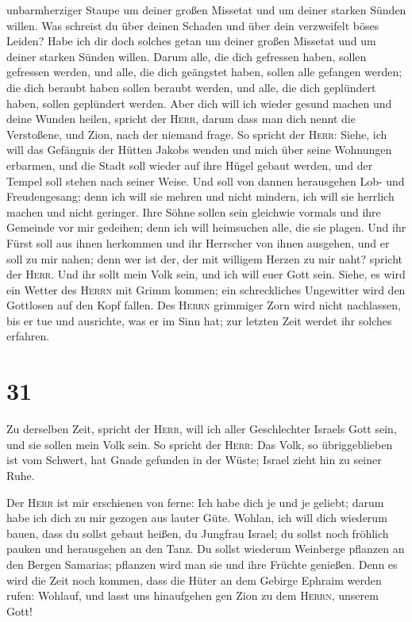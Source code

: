 unbarmherziger Staupe um deiner großen Missetat und um deiner starken
Sünden willen.  Was schreist du über deinen Schaden und
über dein verzweifelt böses Leiden? Habe ich dir doch solches getan um
deiner großen Missetat und um deiner starken Sünden willen.
 Darum alle, die dich gefressen haben, sollen gefressen
werden, und alle, die dich geängstet haben, sollen alle gefangen werden;
die dich beraubt haben sollen beraubt werden, und alle, die dich
geplündert haben, sollen geplündert werden.  Aber dich
will ich wieder gesund machen und deine Wunden heilen, spricht der
\textsc{Herr}, darum dass man dich nennt die Verstoßene, und Zion, nach
der niemand frage.  So spricht der \textsc{Herr}: Siehe,
ich will das Gefängnis der Hütten Jakobs wenden und mich über seine
Wohnungen erbarmen, und die Stadt soll wieder auf ihre Hügel gebaut
werden, und der Tempel soll stehen nach seiner Weise. 
Und soll von dannen herausgehen Lob- und Freudengesang; denn ich will
sie mehren und nicht mindern, ich will sie herrlich machen und nicht
geringer.  Ihre Söhne sollen sein gleichwie vormals und
ihre Gemeinde vor mir gedeihen; denn ich will heimsuchen alle, die sie
plagen.  Und ihr Fürst soll aus ihnen herkommen und ihr
Herrscher von ihnen ausgehen, und er soll zu mir nahen; denn wer ist
der, der mit willigem Herzen zu mir naht? spricht der \textsc{Herr}.
 Und ihr sollt mein Volk sein, und ich will euer Gott
sein.  Siehe, es wird ein Wetter des \textsc{Herrn} mit
Grimm kommen; ein schreckliches Ungewitter wird den Gottlosen auf den
Kopf fallen.  Des \textsc{Herrn} grimmiger Zorn wird
nicht nachlassen, bis er tue und ausrichte, was er im Sinn hat; zur
letzten Zeit werdet ihr solches erfahren.

\hypertarget{section-30}{%
\section{31}\label{section-30}}

 Zu derselben Zeit, spricht der \textsc{Herr}, will ich
aller Geschlechter Israels Gott sein, und sie sollen mein Volk sein.
 So spricht der \textsc{Herr}: Das Volk, so übriggeblieben
ist vom Schwert, hat Gnade gefunden in der Wüste; Israel zieht hin zu
seiner Ruhe.

 Der \textsc{Herr} ist mir erschienen von ferne: Ich habe
dich je und je geliebt; darum habe ich dich zu mir gezogen aus lauter
Güte.  Wohlan, ich will dich wiederum bauen, dass du
sollst gebaut heißen, du Jungfrau Israel; du sollst noch fröhlich pauken
und herausgehen an den Tanz.  Du sollst wiederum Weinberge
pflanzen an den Bergen Samarias; pflanzen wird man sie und ihre Früchte
genießen.  Denn es wird die Zeit noch kommen, dass die
Hüter an dem Gebirge Ephraim werden rufen: Wohlauf, und lasst uns
hinaufgehen gen Zion zu dem \textsc{Herrn}, unserem Gott!

